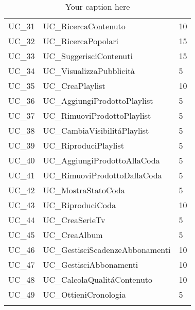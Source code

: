 \begin{longtable}{| p{} | p{} | p{} |}
UC\_31 & UC\_RicercaContenuto & 10\\
UC\_32 & UC\_RicercaPopolari & 15\\
UC\_33 & UC\_SuggerisciContenuti & 15\\
UC\_34 & UC\_VisualizzaPubblicità & 5\\
UC\_35 & UC\_CreaPlaylist & 10\\
UC\_36 & UC\_AggiungiProdottoPlaylist & 5\\
UC\_37 & UC\_RimuoviProdottoPlaylist & 5\\
UC\_38 & UC\_CambiaVisibilitáPlaylist & 5\\
UC\_39 & UC\_RiproduciPlaylist & 5\\
UC\_40 & UC\_AggiungiProdottoAllaCoda & 5\\
UC\_41 & UC\_RimuoviProdottoDallaCoda & 5\\
UC\_42 & UC\_MostraStatoCoda & 5\\
UC\_43 & UC\_RiproduciCoda & 10\\
UC\_44 & UC\_CreaSerieTv & 5\\
UC\_45 & UC\_CreaAlbum & 5\\
UC\_46 & UC\_GestisciScadenzeAbbonamenti & 10\\
UC\_47 & UC\_GestisciAbbonamenti & 10\\
UC\_48 & UC\_CalcolaQualitáContenuto & 10\\
UC\_49 & UC\_OttieniCronologia & 5\\
\caption{Your caption here} %
\label{tab:myfirstlongtable}
\end{longtable}

